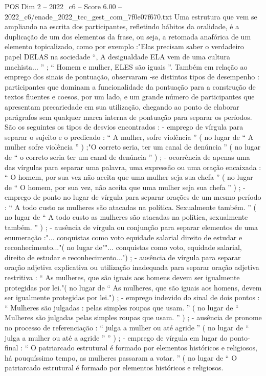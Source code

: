 \begin{textsample}{POS Dim 2 – 2022\_c6 – Score 6.00 – 2022\_c6/enade\_2022\_tec\_gest\_com\_7f0e07f670.txt}
Uma estrutura que vem se ampliando na escrita dos participantes, refletindo hábitos da oralidade, é a duplicação de um dos elementos da frase, ou seja, a retomada anafórica de um elemento topicalizado, como por exemplo :"Elas precisam saber o verdadeiro papel DELAS na sociedade “, A desigualdade ELA vem de uma cultura machista... ” ; “ Homem e mulher, ELES são iguais ”.
Também em relação ao emprego dos sinais de pontuação, observaram -se distintos tipos de desempenho : participantes que dominam a funcionalidade da pontuação para a construção de textos fluentes e coesos, por um lado, e um grande número de participantes que apresentam precariedade em sua utilização, chegando ao ponto de elaborar parágrafos sem qualquer marca interna de pontuação para separar os períodos.
São os seguintes os tipos de desvios encontrados : - emprego de vírgula para separar o sujeito e o predicado : “ A mulher, sofre violência ” ( no lugar de “ A mulher sofre violência ” ) ;"O correto seria, ter um canal de denúncia ” ( no lugar de “ o correto seria ter um canal de denúncia ” ) ; - ocorrência de apenas uma das vírgulas para separar uma palavra, uma expressão ou uma oração encaixada : “ O homem, por sua vez não aceita que uma mulher seja sua chefa ” ( no lugar de “ O homem, por sua vez, não aceita que uma mulher seja sua chefa ” ) ; - emprego de ponto no lugar de vírgula para separar orações de um mesmo período : “ A todo custo as mulheres são atacadas na política.
Sexualmente também. ” ( no lugar de “ A todo custo as mulheres são atacadas na política, sexualmente também. ” ) ; - ausência de vírgula ou conjunção para separar elementos de uma enumeração :"... conquistas como voto equidade salarial direito de estudar e reconhecimento..."( no lugar de""... conquistas como voto, equidade salarial, direito de estudar e reconhecimento...") ; - ausência de vírgula para separar oração adjetiva explicativa ou utilização inadequada para separar oração adjetiva restritiva : “ As mulheres, que são iguais aos homens devem ser igualmente protegidas por lei."( no lugar de “ As mulheres, que são iguais aos homens, devem ser igualmente protegidas por lei.") ; - emprego indevido do sinal de dois pontos : “ Mulheres são julgadas : pelas simples roupas que usam. ” ( no lugar de “ Mulheres são julgadas pelas simples roupas que usam. ” ) ; - ausência de pronome no processo de referenciação : “ julga a mulher ou até agride ” ( no lugar de “ julga a mulher ou até a agride ” ” ) ; - emprego de vírgula em lugar do ponto-final : “ O patriarcado estrutural é formado por elementos históricos e religiosos, há pouquíssimo tempo, as mulheres passaram a votar. ” ( no lugar de “ O patriarcado estrutural é formado por elementos históricos e religiosos.

\end{textsample}
